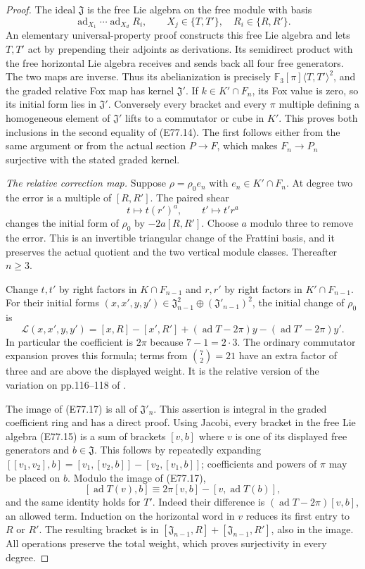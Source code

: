 \begin{proof}
The ideal $\mathfrak J$ is the free Lie
algebra on the free module with basis
\[
 \operatorname{ad}_{X_1}\cdots
 \operatorname{ad}_{X_d}R_i,\qquad
 X_j\in\{T,T'\},\quad R_i\in\{R,R'\}.
 \tag{E77.15}
\]
An elementary universal-property proof
constructs this free Lie algebra and lets
$T,T'$ act by prepending their adjoints
as derivations. Its semidirect product
with the free horizontal Lie algebra
receives and sends back all four free
generators. The two maps are inverse.
Thus its abelianization is precisely
$\mathbb F_3[\pi]\langle T,T'\rangle^2$,
and the graded relative Fox map has
kernel $\mathfrak J'$.
If $k\in K'\cap F_n$, its Fox value is
zero, so its initial form lies in
$\mathfrak J'$. Conversely every bracket
and every $\pi$ multiple defining a
homogeneous element of $\mathfrak J'$
lifts to a commutator or cube in $K'$.
This proves both inclusions in the
second equality of (E77.14).
The first follows either from the same
argument or from the actual section
$P\to F$, which makes $F_n\to P_n$
surjective with the stated graded kernel.

\emph{The relative correction map.}
Suppose $\rho=\rho_0 e_n$ with
$e_n\in K'\cap F_n$.
At degree two the error is a multiple
of $[R,R']$. The paired shear
\[
 t\longmapsto t(r')^a,\qquad
 t'\longmapsto t'r^a
 \tag{E77.16}
\]
changes the initial form of $\rho_0$ by
$-2a[R,R']$. Choose $a$ modulo three to
remove the error. This is an invertible
triangular change of the Frattini basis,
and it preserves the actual quotient
and the two vertical module classes.
Thereafter $n\ge3$.

Change $t,t'$ by right factors in
$K\cap F_{n-1}$ and $r,r'$ by right
factors in $K'\cap F_{n-1}$.
For their initial forms
$(x,x',y,y')\in
\mathfrak J_{n-1}^2\oplus(\mathfrak J'_{n-1})^2$,
the initial change of $\rho_0$ is
\[
 \mathcal L(x,x',y,y')
  =[x,R]-[x',R']
       +(\operatorname{ad}T-2\pi)y
       -(\operatorname{ad}T'-2\pi)y'.
 \tag{E77.17}
\]
In particular the coefficient is $2\pi$
because $7-1=2\cdot3$.
The ordinary commutator expansion proves
this formula; terms from
$\binom72=21$ have an extra factor of
three and are above the displayed weight.
It is the relative version of the
variation on pp.116--118 of
\cite{A_Labute1967}.

The image of (E77.17) is all of
$\mathfrak J'_n$. This assertion is
integral in the graded coefficient
ring and has a direct proof.
Using Jacobi, every bracket in the
free Lie algebra (E77.15) is a sum
of brackets $[v,b]$ where $v$ is one
of its displayed free generators and
$b\in\mathfrak J$. This follows by
repeatedly expanding
$[[v_1,v_2],b]=[v_1,[v_2,b]]
 -[v_2,[v_1,b]]$; coefficients and
powers of $\pi$ may be placed on $b$.
Modulo the image of (E77.17),
\[
 [\operatorname{ad}T(v),b]
       \equiv 2\pi[v,b]-[v,\operatorname{ad}T(b)],
 \tag{E77.18}
\]
and the same identity holds for $T'$.
Indeed their difference is
$(\operatorname{ad}T-2\pi)[v,b]$,
an allowed term. Induction on the
horizontal word in $v$ reduces its
first entry to $R$ or $R'$.
The resulting bracket is in
$[\mathfrak J_{n-1},R]+
 [\mathfrak J_{n-1},R']$, also in
the image. All operations preserve
the total weight, which proves
surjectivity in every degree.


\end{proof}
